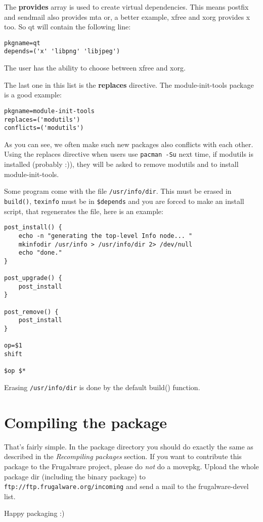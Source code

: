 The \textbf{provides} array is used to create virtual dependencies. This means postfix and sendmail also provides mta or, a better example, xfree and xorg provides x too. So qt will contain the following line:
\begin{verbatim}
pkgname=qt
depends=('x' 'libpng' 'libjpeg')
\end{verbatim}

The user has the ability to choose between xfree and xorg.

The last one in this list is the \textbf{replaces} directive. The module-init-tools package is a good example:
\begin{verbatim}
pkgname=module-init-tools
replaces=('modutils')
conflicts=('modutils')
\end{verbatim}

As you can see, we often make such new packages also conflicts with each other. Using the replaces directive when users use {\tt pacman -Su} next time, if modutils is installed (probably :)), they will be asked to remove modutils and to install module-init-tools.

Some program come with the file {\tt /usr/info/dir}. This must be erased in {\tt build()}, {\tt texinfo} must be in {\tt \$depends} and you are forced to make an install script, that regenerates the file, here is an example:
\begin{verbatim}
post_install() {
	echo -n "generating the top-level Info node... "
	mkinfodir /usr/info > /usr/info/dir 2> /dev/null
	echo "done."
}

post_upgrade() {
	post_install
}

post_remove() {
	post_install
}

op=$1
shift

$op $*
\end{verbatim}

Erasing {\tt /usr/info/dir} is done by the default build() function.

\section{Compiling the package}

That's fairly simple. In the package directory you should do exactly the same as described in the \textit{Recompiling packages} section. If you want to contribute this package to the Frugalware project, please do \textit{not} do a movepkg. Upload the whole package dir (including the binary package) to {\tt ftp://ftp.frugalware.org/incoming} and send a mail to the frugalware-devel list.

Happy packaging :)
